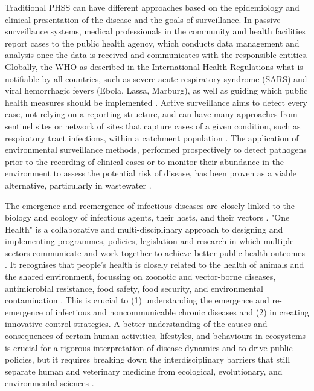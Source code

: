 Traditional PHSS can have different approaches based on the epidemiology and clinical presentation of the disease and the goals of surveillance. 
In passive surveillance systems, medical professionals in the community and health facilities report cases to the public health agency, which conducts data management and analysis once the data is received and communicates with the responsible entities. 
Globally, the \ac{WHO} as described in the International Health Regulations what is notifiable by all countries, such as severe acute respiratory syndrome (SARS) and viral hemorrhagic fevers (Ebola, Lassa, Marburg), as well as guiding which public health measures should be implemented \citep{world_health_organization_international_2005}. 
Active surveillance aims to detect every case, not relying on a reporting structure, and can have many approaches from sentinel sites or network of sites that capture cases of a given condition, such as respiratory tract infections, within a catchment population \citep{murray_infectious_2017, melo-cristino_estudo_2006}. 
The application of environmental surveillance methods, performed prospectively to detect pathogens prior to the recording of clinical cases or to monitor their abundance in the environment to assess the potential risk of disease, has been proven as a viable alternative, particularly in wastewater \citep{andrews_environmental_2020, mcweeney_demonstration_1894, baker_combined_2011, larsen_tracking_2020}.  

The emergence and reemergence of infectious diseases are closely linked to the biology and ecology of infectious agents, their hosts, and their vectors \citep{destoumieux-garzon_one_2018}.
"One Health" is a collaborative and multi-disciplinary approach to designing and implementing programmes, policies, legislation and research in which multiple sectors communicate and work together to achieve better public health outcomes \citep{mackenzie_one_2019}. 
It recognises that people's health is closely related to the health of animals and the shared environment, focussing on zoonotic and vector-borne diseases, antimicrobial resistance, food safety, food security, and environmental contamination \citep{rugarabamu_one-health_2021}.
This is crucial to (1) understanding the emergence and re-emergence of infectious and noncommunicable chronic diseases and (2) in creating innovative control strategies.
A better understanding of the causes and consequences of certain human activities, lifestyles, and behaviours in ecosystems is crucial for a rigorous interpretation of disease dynamics and to drive public policies, but it requires breaking down the interdisciplinary barriers that still separate human and veterinary medicine from ecological, evolutionary, and environmental sciences \citep{destoumieux-garzon_one_2018}. 


